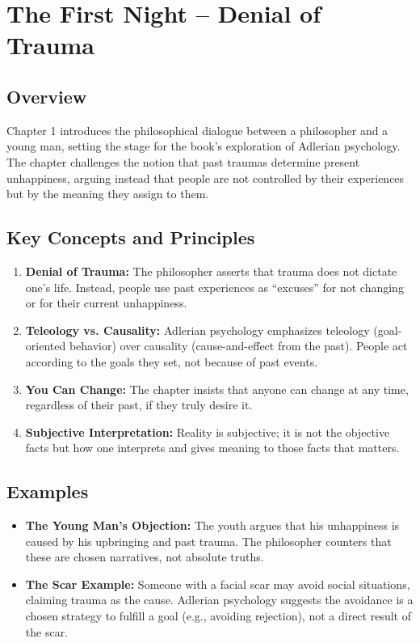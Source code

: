 \section{The First Night – Denial of Trauma}

\subsection*{Overview}
Chapter 1 introduces the philosophical dialogue between a philosopher and a young man, setting the stage for the book’s exploration of Adlerian psychology. The chapter challenges the notion that past traumas determine present unhappiness, arguing instead that people are not controlled by their experiences but by the meaning they assign to them.

\subsection*{Key Concepts and Principles}
\begin{enumerate}
    \item \textbf{Denial of Trauma:} The philosopher asserts that trauma does not dictate one’s life. Instead, people use past experiences as “excuses” for not changing or for their current unhappiness.
    \item \textbf{Teleology vs. Causality:} Adlerian psychology emphasizes teleology (goal-oriented behavior) over causality (cause-and-effect from the past). People act according to the goals they set, not because of past events.
    \item \textbf{You Can Change:} The chapter insists that anyone can change at any time, regardless of their past, if they truly desire it.
    \item \textbf{Subjective Interpretation:} Reality is subjective; it is not the objective facts but how one interprets and gives meaning to those facts that matters.
\end{enumerate}

\subsection*{Examples}
\begin{itemize}
    \item \textbf{The Young Man’s Objection:} The youth argues that his unhappiness is caused by his upbringing and past trauma. The philosopher counters that these are chosen narratives, not absolute truths.
    \item \textbf{The Scar Example:} Someone with a facial scar may avoid social situations, claiming trauma as the cause. Adlerian psychology suggests the avoidance is a chosen strategy to fulfill a goal (e.g., avoiding rejection), not a direct result of the scar.
\end{itemize}

